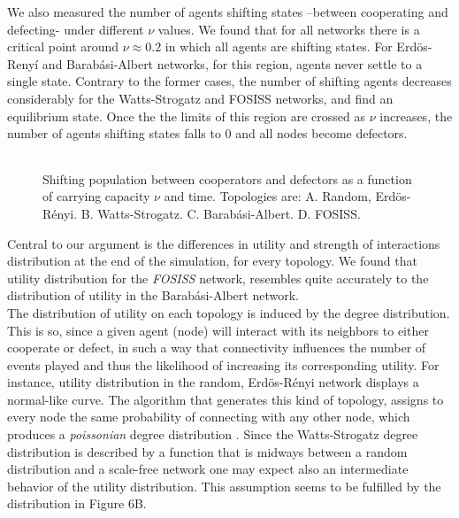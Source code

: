 \documentclass{bmcart}
\def\texttt{[image: ]}
\begin{document}

We also measured the number of agents shifting states --between cooperating and
defecting- under different $\nu$ values. We found that for all networks there is
a critical point around  $\nu \approx 0.2$ in which all agents are shifting
states. For Erd\"{o}s-Reny\'i and Barab\'asi-Albert networks, for this region,
agents never settle to a single state. Contrary to the former cases, the number
of shifting agents decreases considerably for the Watts-Strogatz and FOSISS
networks, and find an equilibrium state. Once the the limits of this region are
crossed as $\nu$ increases, the number of agents shifting states falls to $0$
and all nodes become defectors. \\


\begin{figure} [h!]
\centering
\begin{tabular}{cc}

\end{tabular}
\caption{Shifting population between cooperators and defectors as a function of
carrying capacity $\nu$ and time. Topologies are: A. Random, Erd\"{o}s-R\'enyi. B. Watts-Strogatz. C. Barab\'asi-Albert. D. FOSISS.}\label{state} 
\end{figure}


Central to our argument is the differences in utility and strength of
interactions distribution at the end of the simulation, for every topology. We
found that utility distribution for the \textit{FOSISS} network, resembles quite
accurately to the distribution of utility in the Barab\'asi-Albert
network.\\ 


The distribution of utility on each topology is induced by the degree
distribution. This is so, since a given agent (node) will interact with its
neighbors to either cooperate or defect, in such a way that connectivity
influences the number of events played and thus the likelihood of increasing its
corresponding utility. For instance, utility distribution in the random,
Erd\"{o}s-R\'enyi network displays a normal-like curve. The algorithm that
generates this kind of topology, assigns to every node the same probability of
connecting with any other node, which produces a \textit{poissonian} degree
distribution \cite{ErdosRenyi:59}. Since the Watts-Strogatz degree distribution is
described by a function that is midways between a random distribution and a
scale-free network \cite{Barratmodels:2000} one may expect also  an intermediate
behavior of the utility distribution. This assumption seems to be fulfilled by
the distribution in Figure 6B. \\
\end{document}
